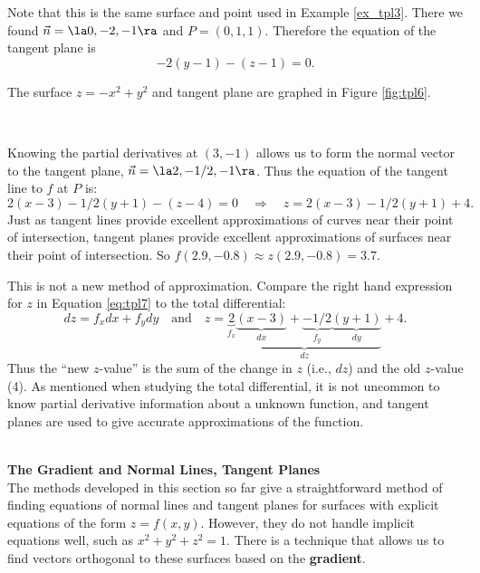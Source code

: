 {Note that this is the same surface and point used in Example \ref{ex_tpl3}. There we found $\vec n = \la 0,-2,-1\ra$ and $P = (0,1,1)$. Therefore the equation of the tangent plane is 
$$-2(y-1)-(z-1)=0.$$

The surface $z=-x^2+y^2$ and tangent plane are graphed in Figure \ref{fig:tpl6}. 
}\\

{Knowing the partial derivatives at $(3,-1)$ allows us to form the normal vector to the tangent plane, $\vec n = \la 2,-1/2,-1\ra$. Thus the equation of the tangent line to $f$ at $P$ is:
\begin{equation}
2(x-3)-1/2(y+1) - (z-4) = 0 \quad \Rightarrow \quad z = 2(x-3)-1/2(y+1)+4.\label{eq:tpl7}\end{equation}
Just as tangent lines provide excellent approximations of curves near their point of intersection, tangent planes provide excellent approximations of surfaces near their point of intersection. So $f(2.9,-0.8) \approx z(2.9,-0.8) = 3.7.$

This is not a new method of approximation. Compare the right hand expression for $z$ in Equation \eqref{eq:tpl7} to the total differential:
$$dz = f_xdx + f_ydy \quad \text{and} \quad z = \underbrace{\underbrace{2}_{f_x}\underbrace{(x-3)}_{dx}+\underbrace{-1/2}_{f_y}\underbrace{(y+1)}_{dy}}_{dz}+4.$$
Thus the ``new $z$-value'' is the sum of the change in $z$ (i.e., $dz$) and the old $z$-value (4). As mentioned when studying the total differential, it is not uncommon to know partial derivative information about a unknown function, and tangent planes are used to give accurate approximations of the function.
}\\

\noindent\textbf{\large The Gradient and Normal Lines, Tangent Planes}\\

The methods developed in this section so far give a straightforward method of finding equations of normal lines and tangent planes for surfaces with explicit equations of the form $z=f(x,y)$. However, they do not handle implicit equations well, such as $x^2+y^2+z^2=1$. There is a technique that allows us to find vectors orthogonal to these surfaces based on the \textbf{gradient}.

